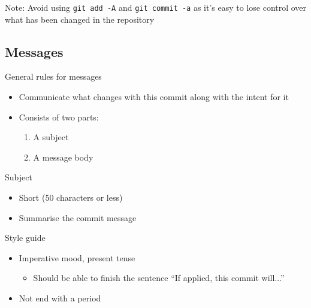 \begin{frame}
    \begin{alertblock}{Note:}
    Avoid using \lstinline{git add -A} and \lstinline{git commit -a} as it's easy to lose control over what has been changed in the repository
    \end{alertblock}
\end{frame}

\subsection{Messages}

\begin{frame}
\begin{block}{General rules for messages}
  \begin{itemize}
      \item Communicate what changes with this commit along with the intent for it
      \item Consists of two parts:
      \begin{enumerate}
          \item A subject
          \item A message body
      \end{enumerate}
  \end{itemize}
\end{block}
\end{frame}

\begin{frame}
\begin{block}{Subject}
  \begin{itemize}
      \item Short (50 characters or less)
      \item Summarise the commit message
  \end{itemize}
\end{block}
\begin{block}{Style guide}
  \begin{itemize}
      \item Imperative mood, present tense
      \begin{itemize}
          \item Should be able to finish the sentence \enquote{If applied, this commit will...}
      \end{itemize}
      \item Not end with a period
  \end{itemize}
\end{block}
\end{frame}

